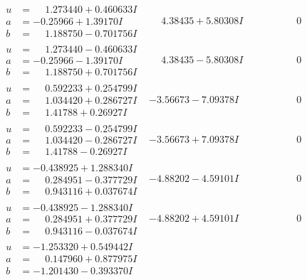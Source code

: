 \documentclass[1p]{elsarticle_modified}
\theoremstyle{definition}
\begin{document}
$$\begin{array}{c|c|c}
\begin{aligned}
u &= \phantom{-}1.273440 + 0.460633 I \\
a &= -0.25966 + 1.39170 I \\
b &= \phantom{-}1.188750 - 0.701756 I\end{aligned}
 & \phantom{-}4.38435 + 5.80308 I & \phantom{-0.000000 } 0 \\ \hline\begin{aligned}
u &= \phantom{-}1.273440 - 0.460633 I \\
a &= -0.25966 - 1.39170 I \\
b &= \phantom{-}1.188750 + 0.701756 I\end{aligned}
 & \phantom{-}4.38435 - 5.80308 I & \phantom{-0.000000 } 0 \\ \hline\begin{aligned}
u &= \phantom{-}0.592233 + 0.254799 I \\
a &= \phantom{-}1.034420 + 0.286727 I \\
b &= \phantom{-}1.41788 + 0.26927 I\end{aligned}
 & -3.56673 - 7.09378 I & \phantom{-0.000000 } 0 \\ \hline\begin{aligned}
u &= \phantom{-}0.592233 - 0.254799 I \\
a &= \phantom{-}1.034420 - 0.286727 I \\
b &= \phantom{-}1.41788 - 0.26927 I\end{aligned}
 & -3.56673 + 7.09378 I & \phantom{-0.000000 } 0 \\ \hline\begin{aligned}
u &= -0.438925 + 1.288340 I \\
a &= \phantom{-}0.284951 - 0.377729 I \\
b &= \phantom{-}0.943116 + 0.037674 I\end{aligned}
 & -4.88202 - 4.59101 I & \phantom{-0.000000 } 0 \\ \hline\begin{aligned}
u &= -0.438925 - 1.288340 I \\
a &= \phantom{-}0.284951 + 0.377729 I \\
b &= \phantom{-}0.943116 - 0.037674 I\end{aligned}
 & -4.88202 + 4.59101 I & \phantom{-0.000000 } 0 \\ \hline\begin{aligned}
u &= -1.253320 + 0.549442 I \\
a &= \phantom{-}0.147960 + 0.877975 I \\
b &= -1.201430 - 0.393370 I\end{aligned}

\end{array}$$
\end{document}
